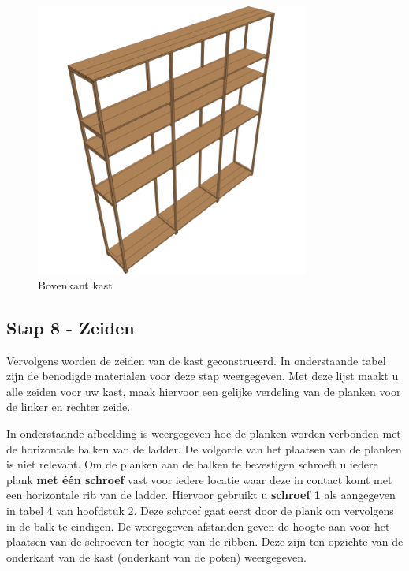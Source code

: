 \documentclass{article}
\begin{document}
\begin{figure}[h!]
    \centering
    \includegraphics[width=0.8\textwidth]{scene 7 - boven.png}
    \caption{Bovenkant kast}
    \label{fig:stap 7}
\end{figure}

\clearpage
\newpage

\subsection{Stap 8 - Zeiden}

Vervolgens worden de zeiden van de kast geconstrueerd. In onderstaande tabel zijn de benodigde materialen voor deze stap weergegeven. Met deze lijst maakt u alle zeiden voor uw kast, maak hiervoor een gelijke verdeling van de planken voor de linker en rechter zeide.



In onderstaande afbeelding is weergegeven hoe de planken worden verbonden met de horizontale balken van de ladder. De volgorde van het plaatsen van de planken is niet relevant. Om de planken aan de balken te bevestigen schroeft u iedere plank \textbf{met \'{e}\'{en} schroef} vast voor iedere locatie waar deze in contact komt met een horizontale rib van de ladder. Hiervoor gebruikt u \textbf{schroef 1} als aangegeven in tabel 4 van hoofdstuk 2. Deze schroef gaat eerst door de plank om vervolgens in de balk te eindigen. De weergegeven afstanden geven de hoogte aan voor het plaatsen van de schroeven ter hoogte van de ribben. Deze zijn ten opzichte van de onderkant van de kast (onderkant van de poten) weergegeven.
\end{document}
